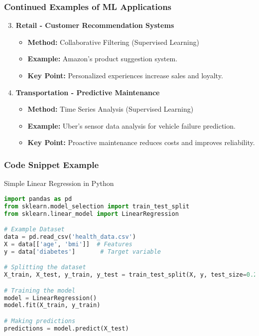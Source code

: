 \documentclass[aspectratio=169]{beamer}
\begin{document}
\begin{frame}[fragile]
    \frametitle{Continued Examples of ML Applications}
    \begin{enumerate}
        \setcounter{enumi}{2} %
        \item \textbf{Retail - Customer Recommendation Systems}
            \begin{itemize}
                \item \textbf{Method:} Collaborative Filtering (Supervised Learning)
                \item \textbf{Example:} Amazon's product suggestion system.
                \item \textbf{Key Point:} Personalized experiences increase sales and loyalty.
            \end{itemize}
        \item \textbf{Transportation - Predictive Maintenance}
            \begin{itemize}
                \item \textbf{Method:} Time Series Analysis (Supervised Learning)
                \item \textbf{Example:} Uber's sensor data analysis for vehicle failure prediction.
                \item \textbf{Key Point:} Proactive maintenance reduces costs and improves reliability.
            \end{itemize}
    \end{enumerate}
\end{frame}

\begin{frame}[fragile]
    \frametitle{Code Snippet Example}
    \begin{block}{Simple Linear Regression in Python}
    \begin{lstlisting}[language=Python]
import pandas as pd
from sklearn.model_selection import train_test_split
from sklearn.linear_model import LinearRegression

# Example Dataset
data = pd.read_csv('health_data.csv')
X = data[['age', 'bmi']]  # Features
y = data['diabetes']       # Target variable

# Splitting the dataset
X_train, X_test, y_train, y_test = train_test_split(X, y, test_size=0.2, random_state=42)

# Training the model
model = LinearRegression()
model.fit(X_train, y_train)

# Making predictions
predictions = model.predict(X_test)
    \end{lstlisting}
    \end{block}
\end{frame}
\end{document}
